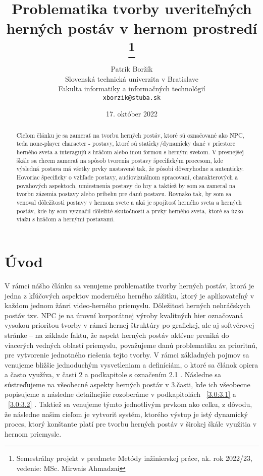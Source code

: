 \documentclass[10pt,twoside,slovak,a4paper]{article}
\title{Problematika tvorby uveriteľných herných postáv v hernom prostredí \thanks{Semestrálny projekt v predmete Metódy inžinierskej práce, ak. rok 2022/23, vedenie: MSc. Mirwais Ahmadzai}} %
\author{Patrik Boržík\\[3pt]
	{\small Slovenská technická univerzita v Bratislave}\\
	{\small Fakulta informatiky a informačných technológií}\\
	{\small \texttt{xborzik@stuba.sk}}
	}
\date{\small 17. október 2022} %
\begin{document}
\maketitle

\begin{abstract}
Cieľom článku je sa zamerať na tvorbu herných postáv, ktoré sú označované ako NPC, teda none-player character - postavy, ktoré sú staticky/dynamicky dané v priestore herného sveta a interagujú s hráčom alebo inou formou s herným svetom. V presnejšej škále sa chcem zamerať na spôsob tvorenia postavy špecifickým procesom, kde výsledná postava má všetky prvky nastavené tak, že pôsobí dôveryhodne a autenticky. Hovoriac špecificky o vzhľade postavy, audiovizuálnom spracovaní, charakterových a povahových aspektoch, umiestnenia postavy do hry a taktiež by som sa zameral na tvorbu zázemia postavy alebo príbehu pre danú postavu. Rovnako tak, by som sa venoval dôležitosti postavy v hernom svete a aká je spojitosť herného sveta a herných postáv, kde by som vyznačil dôležité skutočnosti a prvky herného sveta, ktoré sa úzko viažu s hráčom a hernými postavami.
\end{abstract}



\section{Úvod}
V rámci nášho článku sa venujeme problematike tvorby herných postáv, ktorá je jedna z kľúčových aspektov moderného herného zážitku, ktorý je aplikovateľný v každom jednom žánri video-herného priemyslu. Dôležitosť herných nehráčskych postáv tzv. NPC je na úrovní korporátnej výroby kvalitných hier označovaná vysokou prioritou tvorby v rámci hernej štruktúry po grafickej, ale aj softvérovej stránke – na základe faktu, že aspekt herných postáv aktívne preniká do viacerých vedných oblastí priemyslu, považujeme danú problematiku za prioritnú, pre vytvorenie jednotného riešenia tejto tvorby. V rámci základných pojmov sa venujeme bližšie jednoduchým vysvetleniam a definíciám, o ktoré sa článok opiera a často využíva, v časti 2 a podkapitole s označením 2.1 . Následne sa sústreďujeme na všeobecné aspekty herných postáv v 3.časti, kde ich všeobecne popisujeme a následne detailnejšie rozoberáme v podkapitolách ~\ref{3.0:3.1} a ~\ref{3.0:3.2} . Taktiež sa venujeme týmto jednotlivým prvkom ako celku, z dôvodu, že následne našim cieľom je vytvoriť systém, ktorého výstup je istý dynamický proces, ktorý konštante platí pre tvorbu herných postáv v širokej škále využitia v hernom priemysle.
\end{document}

